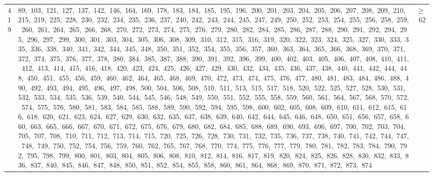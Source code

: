 \begin{longtable}{c|p{}|r}
419 & 89,\ 103,\ 121,\ 127,\ 137,\ 142,\ 146,\ 164,\ 169,\ 178,\ 183,\ 184,\ 185,\ 195,\ 196,\ 200,\ 201,\ 203,\ 204,\ 205,\ 206,\ 207,\ 208,\ 209,\ 210,\ 215,\ 219,\ 225,\ 228,\ 230,\ 232,\ 234,\ 235,\ 236,\ 237,\ 240,\ 242,\ 243,\ 244,\ 245,\ 247,\ 249,\ 250,\ 252,\ 253,\ 254,\ 255,\ 256,\ 258,\ 259,\ 260,\ 261,\ 264,\ 265,\ 266,\ 268,\ 270,\ 272,\ 273,\ 274,\ 275,\ 276,\ 279,\ 280,\ 282,\ 284,\ 285,\ 286,\ 287,\ 288,\ 290,\ 291,\ 292,\ 294,\ 295,\ 296,\ 297,\ 299,\ 300,\ 301,\ 303,\ 304,\ 305,\ 306,\ 308,\ 309,\ 310,\ 312,\ 315,\ 316,\ 319,\ 320,\ 322,\ 323,\ 324,\ 325,\ 327,\ 330,\ 333,\ 335,\ 336,\ 338,\ 340,\ 341,\ 342,\ 344,\ 345,\ 348,\ 350,\ 351,\ 352,\ 354,\ 355,\ 356,\ 357,\ 360,\ 363,\ 364,\ 365,\ 366,\ 368,\ 369,\ 370,\ 371,\ 372,\ 374,\ 375,\ 376,\ 377,\ 378,\ 380,\ 384,\ 385,\ 387,\ 388,\ 390,\ 391,\ 392,\ 396,\ 399,\ 400,\ 402,\ 403,\ 405,\ 406,\ 407,\ 408,\ 410,\ 411,\ 412,\ 413,\ 414,\ 415,\ 416,\ 418,\ 420,\ 423,\ 424,\ 425,\ 426,\ 427,\ 429,\ 430,\ 432,\ 434,\ 435,\ 436,\ 437,\ 438,\ 440,\ 441,\ 442,\ 444,\ 448,\ 450,\ 451,\ 455,\ 456,\ 459,\ 460,\ 462,\ 464,\ 465,\ 468,\ 469,\ 470,\ 472,\ 473,\ 474,\ 475,\ 476,\ 477,\ 480,\ 481,\ 483,\ 484,\ 486,\ 488,\ 490,\ 492,\ 493,\ 494,\ 495,\ 496,\ 497,\ 498,\ 500,\ 504,\ 506,\ 508,\ 510,\ 511,\ 513,\ 515,\ 517,\ 518,\ 520,\ 522,\ 525,\ 527,\ 528,\ 530,\ 531,\ 532,\ 533,\ 534,\ 535,\ 536,\ 539,\ 540,\ 544,\ 545,\ 546,\ 548,\ 549,\ 550,\ 551,\ 552,\ 555,\ 558,\ 559,\ 560,\ 561,\ 564,\ 567,\ 568,\ 570,\ 572,\ 574,\ 575,\ 576,\ 580,\ 581,\ 583,\ 584,\ 585,\ 588,\ 589,\ 590,\ 592,\ 594,\ 595,\ 598,\ 600,\ 602,\ 605,\ 608,\ 609,\ 610,\ 611,\ 612,\ 615,\ 616,\ 618,\ 620,\ 621,\ 623,\ 624,\ 627,\ 629,\ 630,\ 632,\ 635,\ 637,\ 638,\ 639,\ 640,\ 642,\ 644,\ 645,\ 646,\ 648,\ 650,\ 651,\ 656,\ 657,\ 658,\ 660,\ 663,\ 665,\ 666,\ 667,\ 670,\ 671,\ 672,\ 675,\ 676,\ 679,\ 680,\ 682,\ 684,\ 685,\ 688,\ 689,\ 690,\ 693,\ 696,\ 697,\ 700,\ 702,\ 703,\ 704,\ 705,\ 707,\ 708,\ 710,\ 711,\ 712,\ 713,\ 714,\ 715,\ 720,\ 725,\ 726,\ 728,\ 730,\ 731,\ 732,\ 735,\ 736,\ 737,\ 738,\ 740,\ 741,\ 742,\ 744,\ 747,\ 748,\ 749,\ 750,\ 752,\ 754,\ 756,\ 759,\ 760,\ 762,\ 765,\ 767,\ 768,\ 770,\ 774,\ 775,\ 776,\ 777,\ 779,\ 780,\ 781,\ 782,\ 783,\ 784,\ 790,\ 792,\ 795,\ 798,\ 799,\ 800,\ 801,\ 803,\ 804,\ 805,\ 806,\ 808,\ 810,\ 812,\ 814,\ 816,\ 817,\ 819,\ 820,\ 824,\ 825,\ 826,\ 828,\ 830,\ 832,\ 833,\ 836,\ 837,\ 840,\ 845,\ 846,\ 847,\ 848,\ 850,\ 851,\ 852,\ 854,\ 855,\ 858,\ 860,\ 861,\ 864,\ 868,\ 869,\ 870,\ 871,\ 872,\ 873,\ 874 & $\ge$ 62 \\

\end{longtable}
